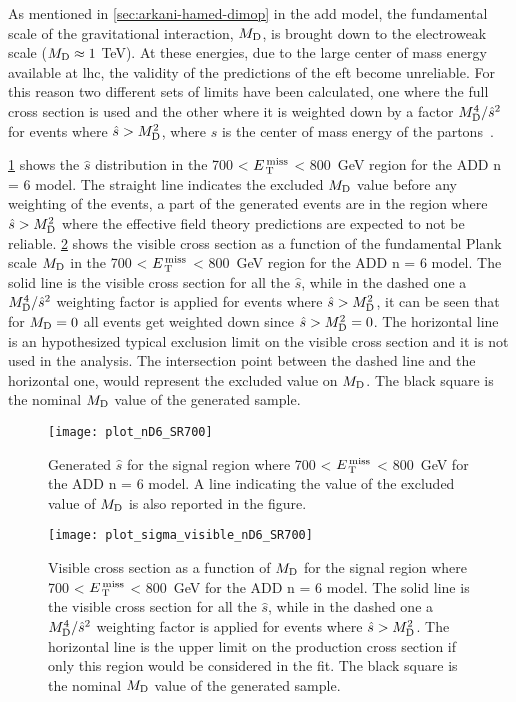 As mentioned in \cref{sec:arkani-hamed-dimop} in the \gls{add} model, the
fundamental scale of the gravitational interaction, $M_\mathrm{D}$, is brought down to
the electroweak scale ($M_\mathrm{D} \approx 1~$TeV). At these energies, due to the large
center of mass energy available at \gls{lhc}, the validity of the predictions of
the \gls{eft} become unreliable. For this reason two different sets of limits
have been calculated, one where the full cross section is used and the other
where it is weighted down by a factor $M_\mathrm{D}^4/\hat{s}^2$ for events where
$\hat{s} > M_\mathrm{D}^2$, where $\hat{s}$ is the center of mass energy of the
partons~\cite{LEDWeightFactor}.


\cref{fig:shat} shows the $\hat{s}$ distribution in the 700 < $E_\mathrm{\, T}^\mathrm{\, miss}$ < 800~GeV
region for the ADD n = 6 model. The straight line indicates the excluded $M_\mathrm{D}$
value before any weighting of the events, a part of the generated events are in
the region where $\hat{s} > M_\mathrm{D}^2$ where the effective field theory predictions
are expected to not be reliable. \cref{fig:vis_sigma_trunc} shows the visible
cross section as a function of the fundamental Plank scale $M_\mathrm{D}$ in the 700 <
$E_\mathrm{\, T}^\mathrm{\, miss}$ < 800~GeV region for the ADD n = 6 model. The solid line is the visible
cross section for all the $\hat{s}$, while in the dashed one a $M_\mathrm{D}^4/\hat{s}^2$
weighting factor is applied for events where $\hat{s} > M_\mathrm{D}^2$, it can be seen
that for $M_\mathrm{D} = 0$ all events get weighted down since $\hat{s} > M_\mathrm{D}^2 = 0$. The
horizontal line is an hypothesized typical exclusion limit on the visible cross
section and it is not used in the analysis. The intersection point between the
dashed line and the horizontal one, would represent the excluded value on
$M_\mathrm{D}$. The black square is the nominal $M_\mathrm{D}$ value of the generated sample.

\begin{figure}[!h]
  \centering
  \texttt{[image: plot\_nD6\_SR700]}
  \caption{Generated $\hat{s}$ for the signal region where 700 < $E_\mathrm{\, T}^\mathrm{\, miss}$ <
    800~GeV for the ADD n = 6 model. A line indicating the value of the excluded
    value of $M_\mathrm{D}$ is also reported in the figure.}
  \label{fig:shat}
\end{figure}

\begin{figure}[!h]
  \texttt{[image: plot\_sigma\_visible\_nD6\_SR700]}
  \caption{Visible cross section as a function of $M_\mathrm{D}$ for the signal region
    where 700 < $E_\mathrm{\, T}^\mathrm{\, miss}$ < 800~GeV for the ADD n = 6 model. The solid line is the
    visible cross section for all the $\hat{s}$, while in the dashed one a
    $M_\mathrm{D}^4/\hat{s}^2$ weighting factor is applied for events where
    $\hat{s} > M_\mathrm{D}^2$. The horizontal line is the upper limit on the production
    cross section if only this region would be considered in the fit. The black
    square is the nominal $M_\mathrm{D}$ value of the generated sample.}
  \label{fig:vis_sigma_trunc}
\end{figure}
